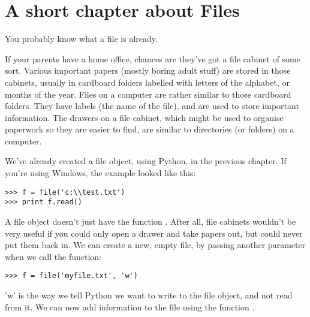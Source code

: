 

\chapter{A short chapter about Files}\label{ch:ashortchapteraboutfiles}

You probably know what a file is already.
\par
\noindent
If your parents have a home office, chances are they've got a file cabinet of some sort.  Various important papers (mostly boring adult stuff) are stored in those cabinets, usually in cardboard folders labelled with letters of the alphabet, or months of the year. Files on a computer are rather similar to those cardboard folders. They have labels (the name of the file), and are used to store important information. The drawers on a file cabinet, which might be used to organise paperwork so they are easier to find, are similar to directories (or folders) on a computer.
\par
We've already created a file object, using Python, in the previous chapter.  If you're using Windows, the example looked like this:

\begin{listing}
\begin{verbatim}
>>> f = file('c:\\test.txt')
>>> print f.read()
\end{verbatim}
\end{listing}

A file object doesn't just have the function . After all, file cabinets wouldn't be very useful if you could only open a drawer and take papers out, but could never put them back in. We can create a new, empty file, by passing another parameter when we call the  function:

\begin{listing}
\begin{verbatim}
>>> f = file('myfile.txt', 'w')
\end{verbatim}
\end{listing}

'w' is the way we tell Python we want to write to the file object, and not read from it.  We can now add information to the file using the function .

